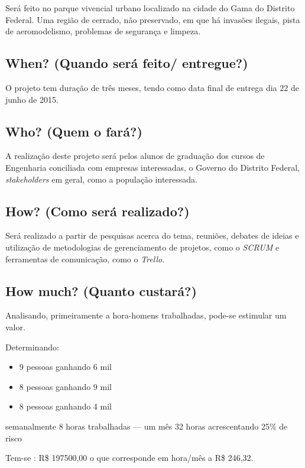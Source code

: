 Ser\'a feito no parque vivencial urbano localizado na cidade do Gama do Distrito Federal. Uma regi\~ao de cerrado, n\~ao preservado, em que h\'a invas\~oes ilegais, pista de aeromodelismo, problemas de seguran\c{c}a e limpeza.

\subsection{When? (Quando ser\'a feito/ entregue?)}

O projeto tem dura\c{c}\~ao de tr\^es meses, tendo como data final de entrega dia 22 de junho de 2015.

\subsection{Who? (Quem o far\'a?)}

A realiza\c{c}\~ao deste projeto ser\'a pelos alunos de gradua\c{c}\~ao dos cursos de Engenharia conciliada com empresas interessadas, o Governo do Distrito Federal, \textit{stakeholders} em geral, como a popula\c{c}\~ao interessada.

\subsection{How? (Como ser\'a realizado?)}

Ser\'a realizado a partir de pesquisas acerca do tema, reuni\~oes, debates de ideias e utiliza\c{c}\~ao de metodologias de gerenciamento de projetos, como o \textit{SCRUM} e ferramentas de comunica\c{c}\~ao, como o \textit{Trello}.

\subsection{How much? (Quanto custar\'a?)}

Analisando, primeiramente a hora-homens trabalhadas, pode-se estimular um valor.

Determinando: 
\begin{itemize}
        \item 9 pessoas ganhando 6 mil
	\item 8 pessoas ganhando 9 mil
	\item 8 pessoas ganhando 4 mil
\end{itemize}

semanalmente 8 horas trabalhadas --- um m\^es 32 horas
acrescentando 25\% de risco

Tem-se : R\$ 197500,00 o que corresponde em hora/m\^es a R\$ 246,32.

